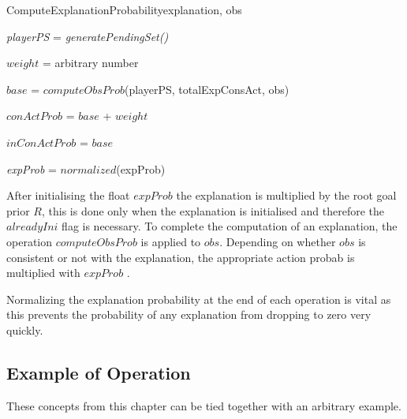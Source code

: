 \documentclass[parskip]{cs4rep}
\begin{document}
\begin{pseudocode}[ruled]{ComputeExplanationProbability}{explanation, obs}
\begin{algorithm}[H]


\textit{playerPS} = \textit{generatePendingSet()} \newline

$weight$ = arbitrary number

$base$ = $computeObsProb$(playerPS, totalExpConsAct, obs)\newline

$conActProb$ = $base$ + $weight$

$inConActProb$ = $base$ \newline


\textit{expProb} = $normalized$(expProb)

\end{algorithm}
\end{pseudocode}

After initialising the float $expProb$ the explanation is multiplied by the root goal prior $R$, this is done only when the explanation is initialised and therefore the $alreadyIni$ flag is necessary. To complete the computation of an explanation, the operation $computeObsProb$ is applied to $obs$. Depending on whether $obs$ is consistent or not with the explanation, the appropriate action probab is multiplied with $expProb$ .

Normalizing the explanation probability at the end of each operation is vital as this prevents the probability of any explanation from dropping to zero very quickly. 

\subsection{Example of Operation}

These concepts from this chapter can be tied together with an arbitrary example.
\end{document}
